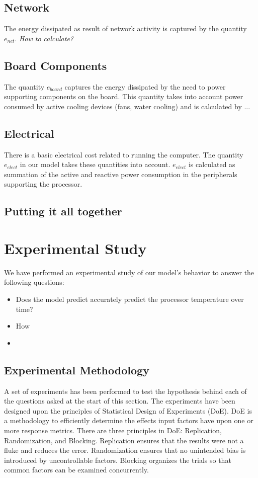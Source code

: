 \documentclass[times, 10pt,onecolumn]{article}
\begin{document}
\subsection{Network}
\label{sec:networkengery}
The energy dissipated as result of network activity is captured by the
quantity $e_{net}$.   \textit{How to calculate?}

\subsection{Board Components}
\label{sec:board}
The quantity $e_{board}$ captures the energy dissipated by the need to
power supporting components on the board.  This quantity takes into
account power consumed by active cooling devices (fans, water cooling)
and is calculated by ...

\subsection{Electrical}
\label{sec:electrical}
There is a basic electrical cost related to running the computer.  The
quantity $e_{elect}$ in our model takes these quantities into account.
$e_{elect}$ is calculated as summation of the active and reactive power
consumption in the peripherals supporting the processor.


\subsection{Putting it all together}
\label{sec:wholemodel}


\section{Experimental Study}
\label{sec:experiment}
We have performed an experimental study of our model's behavior to answer the
following questions:
\begin{itemize}
\item Does the model predict accurately predict the processor
  temperature over time?
\item How 
\item 
\end{itemize}

\subsection{Experimental Methodology}
\label{sec:Method}
A set of experiments has been performed to test the hypothesis behind each of
the questions asked at the start of this section.  The experiments have been
designed upon the principles of Statistical Design of Experiments (DoE).
DoE \cite{Montgomery2005} is a methodology to efficiently determine the effects
input factors have upon one or more response metrics.  There are three
principles in DoE: Replication, Randomization, and Blocking.  Replication
ensures that the results were not a fluke and reduces the error.
Randomization ensures that no unintended bias is introduced by uncontrollable
factors.  Blocking organizes the trials so that common factors can be examined
concurrently.
\end{document}
